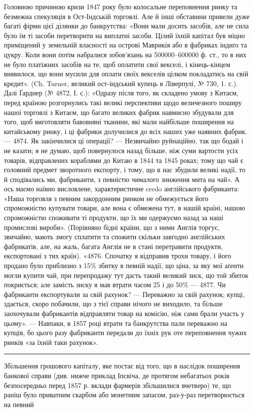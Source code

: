 Головною причиною кризи 1847 року було колосальне переповнення ринку
та безмежна спекуляція в Ост-Індській торговлі. Але й інші обставини привели
дуже багаті фірми цієї ділянки до банкрутства: «Вони мали досить засобів, але не
сила було їм ті засоби перетворити на виплатні засоби. Цілий їхній капітал був міцно
приміщений у земельній власності на острові Маврикія або в фабриках індиґо та
цукру. Коли вони потім набралися зобов’язань на 500000--600000 ф. ст., то
в них не було платіжних засобів на те, щоб оплатити свої векселі, і кінець-кінцем
виявилося, що вони мусили для оплати своїх векселів цілком покладатись
на свій кредит». (Ch. Turner, великий ост-індський купець в Ліверпулі, № 730,
1. с.). Далі Ґарднер (№ 4872, І. с.): «Одразу після того, як складено умову
з Китаєм, перед країною розгорнулись такі великі перспективи щодо величезного
поширу нашої торговлі з Китаєм, що багато великих фабрик навмисно збудували
для того, щоб виготовляти бавовняні тканини, які мали найбільше поширення на китайському
ринку, і ці фабрики долучилися до всіх наших уже наявних фабрик. —
4874. Як закінчилися ці операції? — Незвичайно руйнаційно, так що бодай і не казати;
я не думаю, щоб повернулося назад більше, ніж  суми вартости усіх товарів,
відправлених кораблями до Китаю в 1844 та 1845 роках; тому що чай є головний
предмет зворотного експорту, і тому, що в нас збудили великі надії, то й сподівались ми,
фабриканти, з певністю чималого зниження мита на чай». А ось маємо наївно висловлене,
характеристичне credo англійського фабриканта: «Наша торговля з певним
закордонним ринком не обмежується його спроможністю купувати товари, але вона
є обмежена тут, в нашій країні, нашою спроможністю споживати ті продукти,
що їх ми одержуємо назад за наші промислові вироби». (Порівняно бідні країни,
що з ними Англія торгує, звичайно, мають змогу сплатити та спожити скільки
завгодно англійських фабрикатів, але, на жаль, багата Англія не в стані перетравити
продукти, експортовані з тих країн). «4876. Спочатку я відправив трохи
товару, і його продано було приблизно з 15\% збитку в певній надії, що ціна, за
яку мої аґенти могли купити чай, при перепродажу тут дасть такий великий
зиск, що той збиток покриється; але замість зиску я мав втрати часом 25 і до
50\% — 4877. Чи фабриканти експортували за свій рахунок? — Переважно за свій
рахунок; купці, здається, скоро побачили, що з тієї справи нічого не виходило, та
більше заохочували фабрикантів відправляти товар на комісію, ніж сами брали
участь у цьому». — Навпаки, в 1857 році втрати та банкрутства пали переважно
на купців, бо цього разу фабриканти передали до їхніх рук оте переповнення чужих
ринків «за їхній таки рахунок».

\pfbreak

Збільшення грошового капіталу, яке постає від того, що в наслідок поширення
банкової справи (див. нижче приклад Іпсвіча, де протягом небагатьох років
безпосередньо перед 1857 р. вклади фармерів збільшилися вчетверо) те, що раніш було
приватним скарбом або монетним запасом, раз-у-раз перетворюється на певний
\parbreak{}  %
